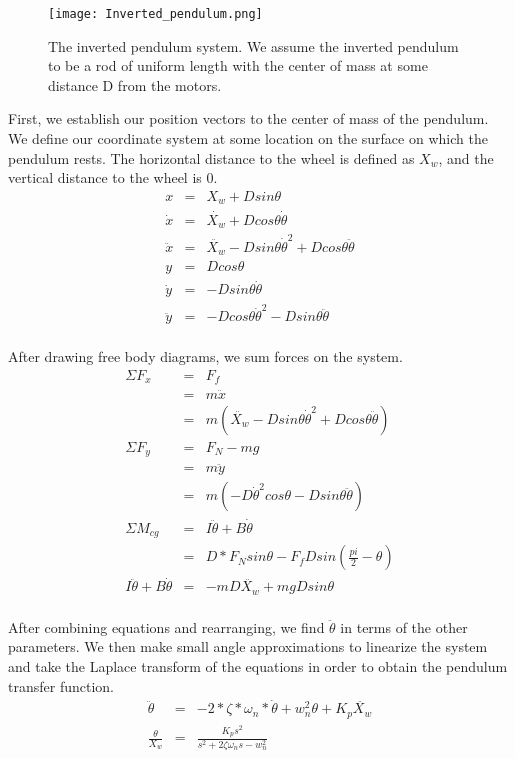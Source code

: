 \documentclass[onecolumn, draftclass]{IEEEtran} %
\begin{document}
\begin{figure}[h]
\begin{center}
\texttt{[image: Inverted\_pendulum.png]}
\caption{The inverted pendulum system.  We assume the inverted pendulum to be a rod of uniform length with the center of mass at some distance D from the motors.}
\label{inverted_pendulum}
\end{center}
\end{figure}

First, we establish our position vectors to the center of mass of the pendulum.  We define our coordinate system at some location on the surface on which the pendulum rests.  The horizontal distance to the wheel is defined as $X_w$, and the vertical distance to the wheel is 0.
\begin{eqnarray}
\label{position}
x &=& X_w+D sin\theta\\
\dot{x} &=& \dot{X_w}+D cos\theta \dot{\theta}\\
\ddot{x} &=& \ddot{X_w}-D sin\theta\dot{\theta}^2+Dcos\theta\ddot{\theta}\\
y &=& D cos\theta\\
\dot{y} &=& -D sin\theta\dot{\theta}\\
\ddot{y} &=& -D cos\theta\dot{\theta}^2-Dsin\theta\ddot{\theta}\\
\end{eqnarray}

After drawing free body diagrams, we sum forces on the system.
\begin{eqnarray}
\label{sum_force}
\Sigma F_x &=& F_f\\
&=& m\ddot{x}\\
&=& m(\ddot{X_w}-D sin\theta\dot{\theta}^2+Dcos\theta\ddot{\theta})\\
\Sigma F_y &=& F_N - mg\\
&=& m\ddot{y}\\
&=& m(-D \dot{\theta}^2 cos\theta-Dsin\theta\ddot{\theta})\\
\Sigma M_{cg} &=& I\ddot{\theta}+B\dot{\theta}\\
&=& D*F_N sin\theta - F_fDsin(\frac{pi}{2} - \theta)\\
I\ddot{\theta}+B\dot{\theta}&=& - mD\ddot{X_w}+mgDsin\theta\\
\end{eqnarray}

After combining equations and rearranging, we find $\ddot{\theta}$ in terms of the other parameters.  We then make small angle approximations to linearize the system and take the Laplace transform of the equations in order to obtain the pendulum transfer function.
\begin{eqnarray}
\label{pend_transfer_fcn}
\ddot{\theta} &=& -2*\zeta*\omega_n*\dot{\theta} + w_n^2\theta +K_p\ddot{X_w}\\
\frac{\theta}{X_w} &=& \frac{K_ps^2}{s^2+2\zeta\omega_ns - w_n^2}\\
\end{eqnarray}
\end{document}
